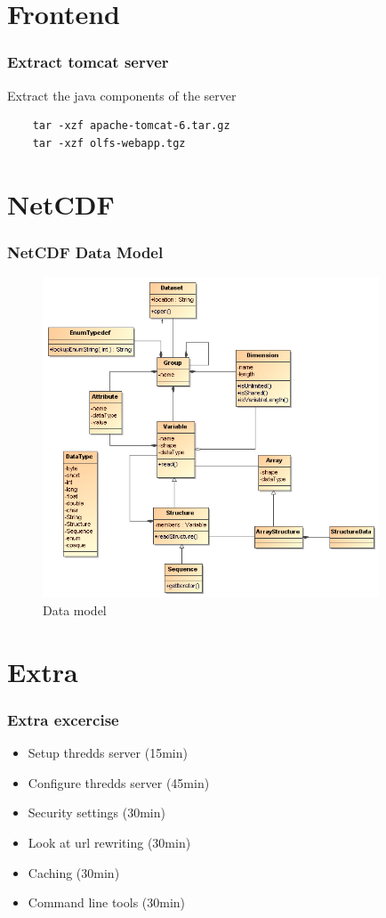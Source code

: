 \documentclass[]{beamer}
\begin{document}
\section{Frontend}
\begin{frame}[fragile]
  \frametitle{Extract tomcat server}
  

  \lstset{language=bash}
  \begin{block}{Extract the java components of the server}
  \begin{lstlisting}
    tar -xzf apache-tomcat-6.tar.gz
    tar -xzf olfs-webapp.tgz
  \end{lstlisting}
  
  \end{block}


\end{frame}


\section{NetCDF}
\frame
{
  \frametitle{NetCDF Data Model}
  \begin{figure}[htbp]
   \centering
   \includegraphics[width=10cm]{CDM-UML.png}
   \caption{Data model}
   \label{fig:processes}
\end{figure}

}


\section{Extra}
\frame
{
  \frametitle{Extra excercise}
  \begin{itemize}
    \item Setup thredds server (15min)
    \item Configure thredds server (45min)
    \item Security settings (30min)
    \item Look at url rewriting (30min)
    \item Caching (30min)
    \item Command line tools (30min)
  \end{itemize}

}


  
  
\end{document}
